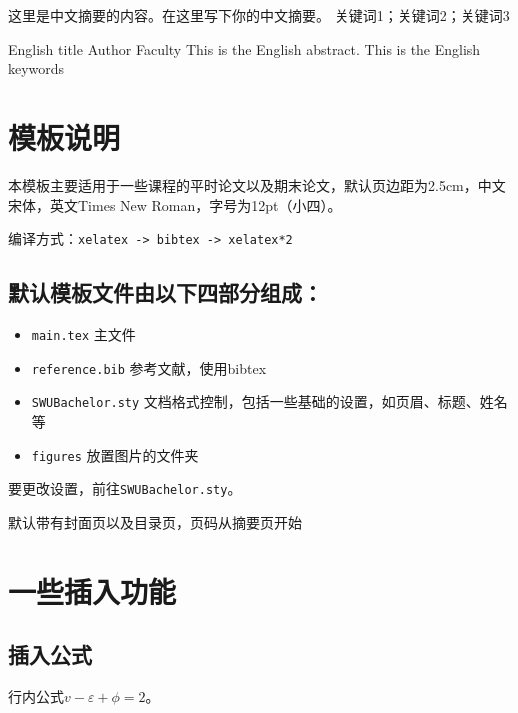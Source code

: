 \documentclass[zihao=-4,hyperref,a4paper,UTF8,autoindent=2em]{ctexart}
\begin{document}
\cover
\thispagestyle{empty} %

\newpage
\tableofcontents

\newpage\setcounter{page}{1} 

\chineseabstract
    {这里是中文摘要的内容。在这里写下你的中文摘要。} %
    {关键词1；关键词2；关键词3} %

\englishabstract
    {English title} %
    {Author}  %
    {Faculty} %
    {This is the English abstract. } %
    {This is the English keywords } %

\newpage
\section{模板说明}

本模板主要适用于一些课程的平时论文以及期末论文，默认页边距为2.5cm，中文宋体，英文Times New Roman，字号为12pt（小四）。

编译方式：\verb|xelatex -> bibtex -> xelatex*2|

\subsection{默认模板文件由以下四部分组成：}
\begin{itemize}
    \item \texttt{main.tex} 主文件
    \item \texttt{reference.bib} 参考文献，使用bibtex
    \item \texttt{SWUBachelor.sty} 文档格式控制，包括一些基础的设置，如页眉、标题、姓名等
    \item \texttt{figures} 放置图片的文件夹
\end{itemize}

要更改设置，前往\texttt{SWUBachelor.sty}。

默认带有封面页以及目录页，页码从摘要页开始

\newpage\section{一些插入功能}
\subsection{插入公式}
行内公式$v-\varepsilon+\phi=2$。
\end{document}

